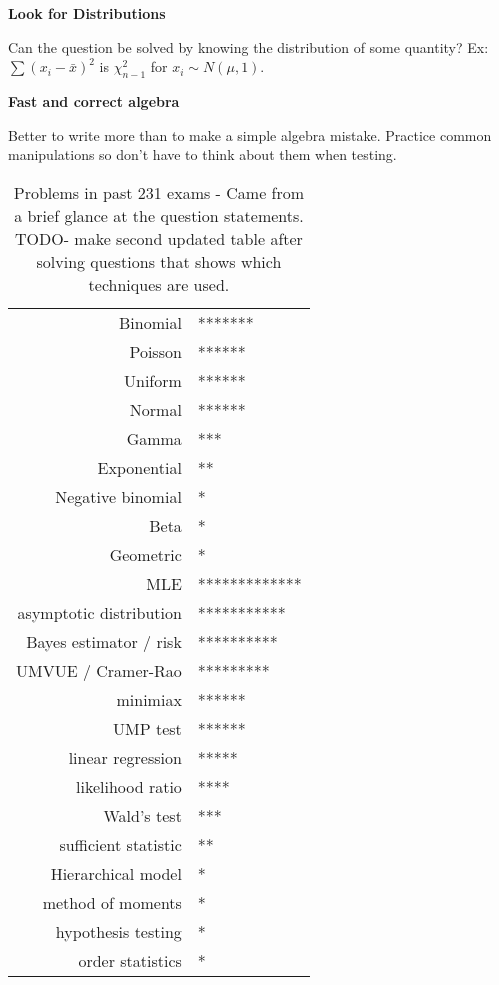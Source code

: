 \documentclass[10pt, twocolumn]{article}
\begin{document}
\textbf{Look for Distributions} 

Can the question be solved by knowing the distribution of some
quantity?  Ex: $\sum (x_i - \bar{x})^2$ is $\chi^2_{n-1}$ for
$x_i \sim N(\mu, 1)$.

\textbf{Fast and correct algebra}

Better to write more than to make a simple algebra mistake.
Practice common manipulations so don't have to think about them
when testing.

\begin{table}[]
    \centering
    \caption{Problems in past 231 exams - Came from a brief glance at the
    question statements. TODO- make second updated table after solving
    questions that shows which techniques are used.}
    \label{231problems}
    \begin{tabular}{rl}

        Binomial                & ******* \\
        Poisson                 & ****** \\
        Uniform                 & ****** \\
        Normal                  & ****** \\
        Gamma                   & *** \\
        Exponential             & ** \\
        Negative binomial       & * \\
        Beta                    & * \\
        Geometric               & * \\
        MLE                     & ************* \\
        asymptotic distribution & *********** \\
        Bayes estimator / risk  & ********** \\
        UMVUE / Cramer-Rao      & ********* \\
        minimiax                & ****** \\
        UMP test                & ****** \\
        linear regression       & ***** \\
        likelihood ratio        & **** \\
        Wald's test             & *** \\
        sufficient statistic    & ** \\
        Hierarchical model      & * \\
        method of moments       & * \\
        hypothesis testing      & * \\
        order statistics        & * \\

    \end{tabular}
\end{table}
\end{document}

